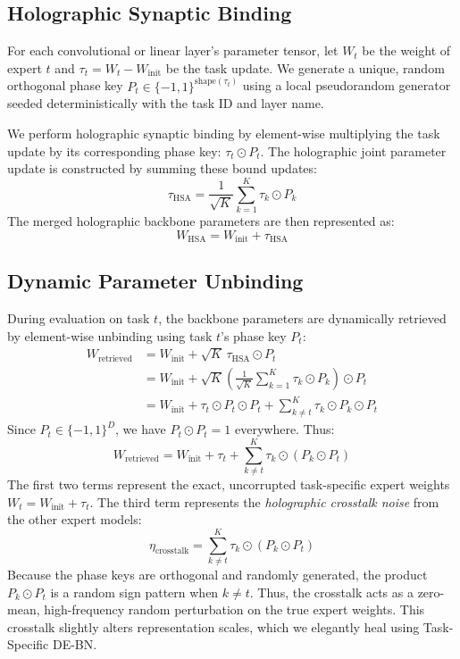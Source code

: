 \documentclass{article}
\theoremstyle{plain}
\theoremstyle{definition}
\theoremstyle{remark}
\begin{document}
\subsection{Holographic Synaptic Binding}
For each convolutional or linear layer's parameter tensor, let $W_t$ be the weight of expert $t$ and $\tau_t = W_t - W_\text{init}$ be the task update. We generate a unique, random orthogonal phase key $P_t \in \{-1, 1\}^{\text{shape}(\tau_t)}$ using a local pseudorandom generator seeded deterministically with the task ID and layer name. 

We perform holographic synaptic binding by element-wise multiplying the task update by its corresponding phase key: $\tau_t \odot P_t$. The holographic joint parameter update is constructed by summing these bound updates:
\begin{equation}
    \tau_\text{HSA} = \frac{1}{\sqrt{K}} \sum_{k=1}^K \tau_k \odot P_k
\end{equation}
The merged holographic backbone parameters are then represented as:
\begin{equation}
    W_\text{HSA} = W_\text{init} + \tau_\text{HSA}
\end{equation}

\subsection{Dynamic Parameter Unbinding}
During evaluation on task $t$, the backbone parameters are dynamically retrieved by element-wise unbinding using task $t$'s phase key $P_t$:
\begin{align}
    W_\text{retrieved} &= W_\text{init} + \sqrt{K} \, \tau_\text{HSA} \odot P_t \nonumber \\
    &= W_\text{init} + \sqrt{K} \left( \frac{1}{\sqrt{K}} \sum_{k=1}^K \tau_k \odot P_k \right) \odot P_t \nonumber \\
    &= W_\text{init} + \tau_t \odot P_t \odot P_t + \sum_{k \neq t}^K \tau_k \odot P_k \odot P_t
\end{align}
Since $P_t \in \{-1, 1\}^D$, we have $P_t \odot P_t = 1$ everywhere. Thus:
\begin{equation}
    W_\text{retrieved} = W_\text{init} + \tau_t + \sum_{k \neq t}^K \tau_k \odot (P_k \odot P_t)
\end{equation}
The first two terms represent the exact, uncorrupted task-specific expert weights $W_t = W_\text{init} + \tau_t$. The third term represents the \emph{holographic crosstalk noise} from the other expert models:
\begin{equation}
    \eta_\text{crosstalk} = \sum_{k \neq t}^K \tau_k \odot (P_k \odot P_t)
\end{equation}
Because the phase keys are orthogonal and randomly generated, the product $P_k \odot P_t$ is a random sign pattern when $k \neq t$. Thus, the crosstalk acts as a zero-mean, high-frequency random perturbation on the true expert weights. This crosstalk slightly alters representation scales, which we elegantly heal using Task-Specific DE-BN.
\end{document}
